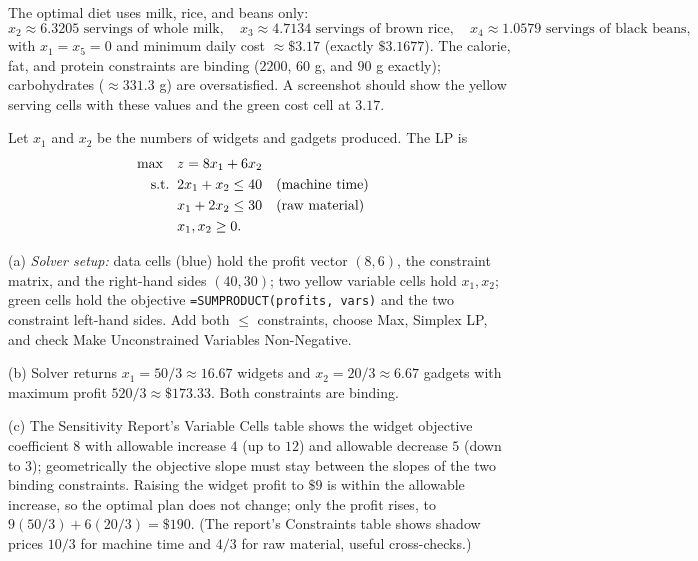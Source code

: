 The optimal diet uses milk, rice, and beans only:
\[
x_2 \approx 6.3205 \text{ servings of whole milk}, \quad x_3 \approx 4.7134 \text{ servings of brown rice}, \quad x_4 \approx 1.0579 \text{ servings of black beans},
\]
with $x_1 = x_5 = 0$ and minimum daily cost $\approx \$3.17$ (exactly $\$3.1677$). The calorie, fat, and protein constraints are binding ($2200$, $60$ g, and $90$ g exactly); carbohydrates ($\approx 331.3$ g) are oversatisfied. A screenshot should show the yellow serving cells with these values and the green cost cell at $3.17$.



Let $x_1$ and $x_2$ be the numbers of widgets and gadgets produced. The LP is
\begin{align*}
\max \quad & z = 8x_1 + 6x_2\\
\text{s.t.}\;\; & 2x_1 + x_2 \leq 40 && \text{(machine time)}\\
& x_1 + 2x_2 \leq 30 && \text{(raw material)}\\
& x_1, x_2 \geq 0.
\end{align*}

(a) \emph{Solver setup:} data cells (blue) hold the profit vector $(8,6)$, the constraint matrix, and the right-hand sides $(40, 30)$; two yellow variable cells hold $x_1, x_2$; green cells hold the objective \texttt{=SUMPRODUCT(profits, vars)} and the two constraint left-hand sides. Add both $\leq$ constraints, choose Max, Simplex LP, and check Make Unconstrained Variables Non-Negative.

(b) Solver returns $x_1 = 50/3 \approx 16.67$ widgets and $x_2 = 20/3 \approx 6.67$ gadgets with maximum profit $520/3 \approx \$173.33$. Both constraints are binding.

(c) The Sensitivity Report's Variable Cells table shows the widget objective coefficient $8$ with allowable increase $4$ (up to $12$) and allowable decrease $5$ (down to $3$); geometrically the objective slope must stay between the slopes of the two binding constraints. Raising the widget profit to $\$9$ is within the allowable increase, so the optimal plan does not change; only the profit rises, to $9(50/3) + 6(20/3) = \$190$. (The report's Constraints table shows shadow prices $10/3$ for machine time and $4/3$ for raw material, useful cross-checks.)

